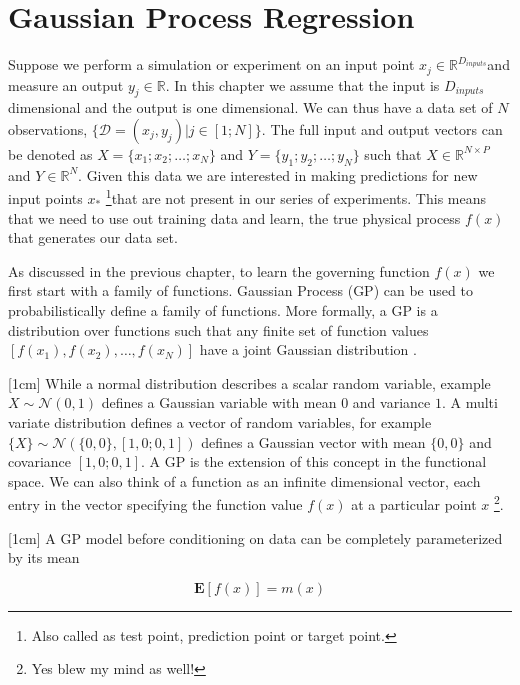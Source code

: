 \chapter{Gaussian Process Regression}
\label{chapGp}

Suppose we perform a simulation or experiment on an input point $x_{j} \in \mathbb{R}^{D_{inputs}}$and measure an output $y_{j} \in \mathbb{R}$. In this chapter we assume that the input is $D_{inputs}$ dimensional and the output is one dimensional. We can thus have a data set of $N$ observations, $\{\mathcal{D} = (x_{j}, y_{j}) | j \in [1; N] \}$. The full input and output vectors can be denoted as $X = \{x_{1}; x_{2}; \ldots ; x_{N}\}$ and $Y = \{y_{1}; y_{2}; \ldots ; y_{N}\}$ such that $X \in \mathbb{R}^{N \times P}$ and $Y \in \mathbb{R}^{N }$. Given this data we are interested in making predictions for new input points $x_{*}$ \footnote{Also called as test point, prediction point or target point.}that are not present in our series of experiments. This means that we need to use out training data and learn, the true physical process  $f(x)$ that generates our data set.

As discussed in the previous chapter, to learn the governing function $f(x)$ we first start with a family of functions. Gaussian Process (GP) can be used to probabilistically define a family of functions. More formally, a GP is a distribution over functions such that any finite set of function values $[f(x_{1}), f(x_{2}), \ldots, f(x_{N})]$ have a joint Gaussian distribution \cite{rasmussen2006gaussian}. 

[1cm]
While a normal distribution describes a scalar random variable, example $X \sim \mathcal{N}(0, 1)$ defines a Gaussian variable with mean $0$ and variance $1$. A multi variate distribution defines a vector of random variables, for example $\{X\} \sim \mathcal{N}(\{0, 0\}, [1, 0; 0, 1])$ defines a Gaussian vector with mean $\{0, 0\}$ and covariance $[1, 0; 0, 1]$. A GP is the extension of this concept in the functional space. We can also think of a function as an infinite dimensional vector, each entry in the vector specifying the function value $f(x)$ at a particular point $x$ \footnote{Yes blew my mind as well!}. 

[1cm]
A GP model before conditioning on data can be completely parameterized by its mean

\begin{equation}\label{eq:meanGP}
\mathbf{E}[f(x)] = m(x)
\end{equation}

